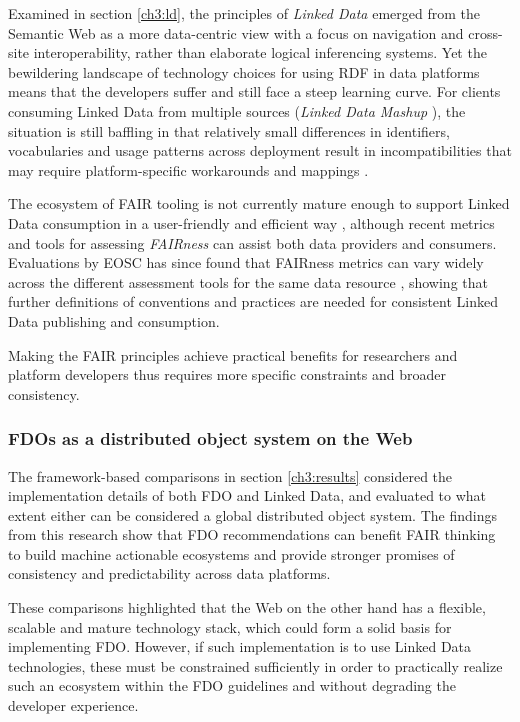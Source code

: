Examined in section \vref{ch3:ld}, the principles of \emph{Linked Data} emerged from the Semantic Web as a more data-centric view with a focus on navigation and cross-site interoperability, rather than elaborate logical inferencing systems.  
Yet the bewildering landscape of technology choices for using RDF in data platforms means that the developers suffer and still face a steep learning curve. 
For clients consuming Linked Data from multiple sources (\emph{Linked Data Mashup} \cite{Tran 2014}), the situation is still baffling in that relatively small differences in identifiers, vocabularies and usage patterns across deployment result in incompatibilities that may require platform-specific workarounds and mappings \cite{Millard 2010}. 

The ecosystem of FAIR tooling is not currently mature enough to support Linked Data consumption in a user-friendly and efficient way \cite{Thompson 2020}, although recent metrics and tools for assessing \emph{FAIRness} \cite{Wilkinson 2018} can assist both data providers and consumers. 
Evaluations by EOSC has since found that FAIRness metrics can vary widely across the different assessment tools for the same data resource \cite{10.5281/zenodo.7463421}, showing that further definitions of conventions and practices are needed for consistent Linked Data publishing and consumption. 

Making the FAIR principles achieve practical benefits for researchers and platform developers thus requires more specific constraints and broader consistency.

\subsubsection{FDOs as a distributed object system on the Web}

The framework-based comparisons in section \vref{ch3:results} considered the implementation details of both FDO and Linked Data, and evaluated to what extent either can be considered a global distributed object system. 
The findings from this research show that FDO recommendations can benefit FAIR thinking to build machine actionable ecosystems and provide stronger promises of consistency and predictability across data platforms. 

These comparisons highlighted that the Web on the other hand has a flexible, scalable and mature technology stack, which could form a solid basis for implementing FDO. 
However, if such implementation is to use Linked Data technologies, these must be constrained sufficiently in order to practically realize such an ecosystem within the FDO guidelines and without degrading the developer experience.


